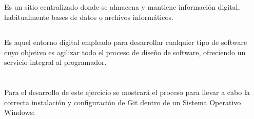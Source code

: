 \documentclass[10pt,a4paper]{article} %
\begin{document}
	\subsection{ \color{colorESCOM}{Repositorio}}
	{\large Es un sitio centralizado donde se almacena y mantiene informaci{\' o}n digital, habitualmente bases de datos o archivos inform{\' a}ticos.}
	
	\subsection{ \color{colorESCOM}{Entorno de Desarrollo (IDE))}}
	{\large Es aquel entorno digital empleado para desarrollar cualquier tipo de software cuyo objetivo es agilizar todo el proceso de dise{\~{n}}o de software, ofreciendo un servicio integral al programador.}
	
	\pagebreak
	
	\section{\color{colorIPN}{Desarrollo}}\label{instal}
	{\large Para el desarrollo de este ejercicio se mostrar{\' a} el proceso para llevar a cabo la correcta instalaci{\' o}n y configuraci{\' o}n de Git dentro de un Sistema Operativo Windows:}
	
\end{document}
